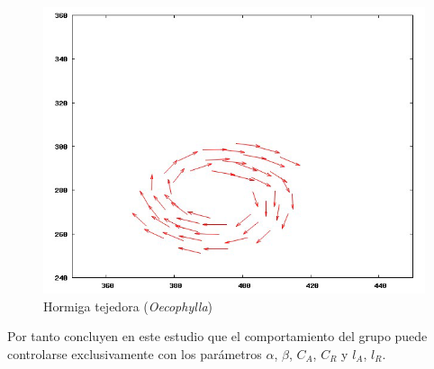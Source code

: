\begin{figure}[!ht]
    \includegraphics[scale=0.3]{fig/cap02/atraccionRepulsion/14.png}
\caption{Hormiga tejedora (\textit{Oecophylla})}
\label{fig:remolino}
\end{figure}

Por tanto concluyen en este estudio que el comportamiento del grupo puede controlarse exclusivamente con los parámetros $\alpha$, $\beta$, $C_A$, $C_R$ y $l_A$, $l_R$.